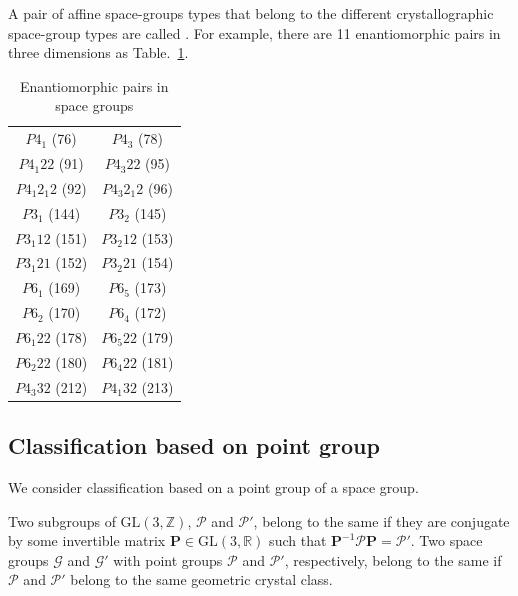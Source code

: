 A pair of affine space-groups types that belong to the different crystallographic space-group types are called .
For example, there are 11 enantiomorphic pairs in three dimensions as Table.~\ref{table:enantiomorphic-pairs-3d}.

\begin{table}[htb]
  \centering
  \caption{Enantiomorphic pairs in space groups}
  \label{table:enantiomorphic-pairs-3d}
  \begin{tabular}[h]{cc}
    \hline\hline
    $P 4_{1}$ (76)         & $P 4_{3}$ (78) \\
    $P 4_{1} 2 2$ (91)     & $P 4_{3} 2 2$ (95) \\
    $P 4_{1} 2_{1} 2$ (92) & $P 4_{3} 2_{1} 2$ (96) \\
    $P 3_{1}$ (144)        & $P 3_{2}$ (145) \\
    $P 3_{1} 1 2$ (151)    & $P 3_{2} 1 2$ (153) \\
    $P 3_{1} 2 1$ (152)    & $P 3_{2} 2 1$ (154) \\
    $P 6_{1}$ (169)        & $P 6_{5}$ (173) \\
    $P 6_{2}$ (170)        & $P 6_{4}$ (172) \\
    $P 6_{1} 2 2$ (178)    & $P 6_{5} 2 2$ (179) \\
    $P 6_{2} 2 2$ (180)    & $P 6_{4} 2 2$ (181) \\
    $P 4_{3} 3 2$ (212)    & $P 4_{1} 3 2$ (213) \\
    \hline\hline
  \end{tabular}
\end{table}

\subsection{\label{sec:geometric-class}Classification based on point group}

We consider classification based on a point group of a space group.

\begin{screen}
  \begin{defn}
    Two subgroups of $\mathrm{GL}(3, \mathbb{Z})$, $\mathcal{P}$ and $\mathcal{P}'$, belong to the same  if they are conjugate by some invertible matrix $\bm{P} \in \mathrm{GL}(3, \mathbb{R})$ such that $\bm{P}^{-1} \mathcal{P} \bm{P} = \mathcal{P}'$.
    Two space groups $\mathcal{G}$ and $\mathcal{G}'$ with point groups $\mathcal{P}$ and $\mathcal{P}'$, respectively, belong to the same  if $\mathcal{P}$ and $\mathcal{P}'$ belong to the same geometric crystal class.
  \end{defn}
\end{screen}

